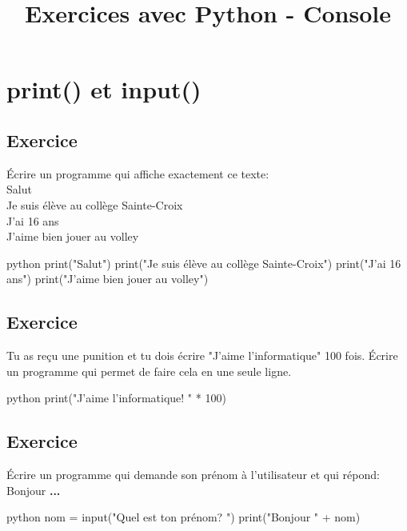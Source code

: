\documentclass[a4paper,11pt]{article}
\begin{document}
\title{Exercices avec Python - Console}
\date{}
\maketitle

\section{print() et input()}

\subsection{Exercice}
Écrire un programme qui affiche exactement ce texte:\\
Salut\\
Je suis élève au collège Sainte-Croix\\
J'ai 16 ans\\
J'aime bien jouer au volley\\
\begin{solution}
\begin{code}[interactive]{python}
print("Salut")
print("Je suis élève au collège Sainte-Croix")
print("J'ai 16 ans")
print("J'aime bien jouer au volley")
\end{code}
\end{solution}

\subsection{Exercice}
Tu as reçu une punition et tu dois écrire "J'aime l'informatique" 100 fois.
Écrire un programme qui permet de faire cela en une seule ligne.
\begin{solution}
\begin{code}[interactive]{python}
print("J'aime l'informatique! \n" * 100)
\end{code}
\end{solution}

\subsection{Exercice}
Écrire un programme qui demande son prénom à l'utilisateur et qui répond:\\
Bonjour \textbf{...}\\
\begin{solution}
\begin{code}[interactive]{python}
nom = input("Quel est ton prénom? ")
print("Bonjour " + nom)
\end{code}
\end{solution}
\end{document}
